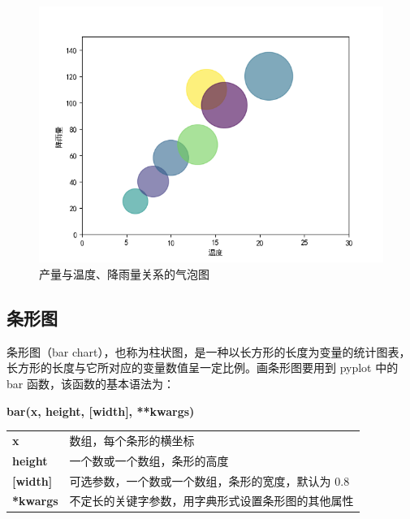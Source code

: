 \begin{figure}[!ht]
  \centering
  \includegraphics[scale=0.8]{figure/scatter2.png}
  \caption{产量与温度、降雨量关系的气泡图}\label{fig:scatter2}
\end{figure}

\clearpage

\subsection{条形图}

条形图（bar chart），也称为柱状图，是一种以长方形的长度为变量的统计图表，长方形的长度与它所对应的变量数值呈一定比例。画条形图要用到 pyplot 中的 bar 函数，该函数的基本语法为：

\begin{center}
\begin{tcolorbox}[title = bar 函数的语法]
\textbf{bar(x, height, [width],  **kwargs)}
\tcblower
\vspace{10pt}

\begin{tcboutputlisting}
\begin{tabular}{>{\bfseries}ll}
  x &数组，每个条形的横坐标\\
  height & 一个数或一个数组，条形的高度\\

[width] &可选参数，一个数或一个数组，条形的宽度，默认为 0.8\\

**kwargs &不定长的关键字参数，用字典形式设置条形图的其他属性
\end{tabular}
\end{tcboutputlisting}
\tcbuselistingtext
\end{tcolorbox}
\end{center}

